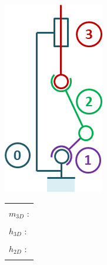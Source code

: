 \documentclass[10pt,fleqn]{article} %
\begin{document}
\begin{multicols}{2}
\begin{minipage}[c]{.45\linewidth}
\begin{center}
\includegraphics[width=.8\linewidth]{images/cas_10.png}
\end{center}
\end{minipage} \hfill
\begin{minipage}[c]{.5\linewidth}
\begin{center}
\begin{tabular}{|p{3cm}|}
\hline 
\\
$m_{3D}$ : \\
\\
$h_{3D}$ : \\
\\
$h_{2D}$ : \\
\\
\hline
\end{tabular}
\end{center}
\end{minipage}



\end{multicols}
\end{document}
